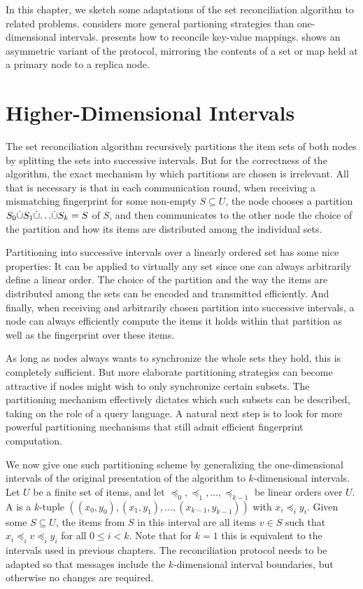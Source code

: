 
In this chapter, we sketch some adaptations of the set reconciliation algorithm to related problems.  considers more general partioning strategies than one-dimensional intervals.  presents how to reconcile key-value mappings.  shows an asymmetric variant of the protocol, mirroring the contents of a set or map held at a primary node to a replica node.

\section{Higher-Dimensional Intervals}
\label{general-partitions}

The set reconciliation algorithm recursively partitions the item sets of both nodes by splitting the sets into successive intervals. But for the correctness of the algorithm, the exact mechanism by which partitions are chosen is irrelevant. All that is necessary is that in each communication round, when receiving a mismatching fingerprint for some non-empty $S \subseteq U$, the node chooses a partition ${S_0} \dot{\cup} {{S_1} \dot{\cup} {{\ldots} \dot{\cup} {S_k}}} = S$ of $S$, and then communicates to the other node the choice of the partition and how its items are distributed among the individual sets.

Partitioning into successive intervals over a linearly ordered set has some nice properties: It can be applied to virtually any set since one can always arbitrarily define a linear order. The choice of the partition and the way the items are distributed among the sets can be encoded and transmitted efficiently. And finally, when receiving and arbitrarily chosen partition into successive intervals, a node can always efficiently compute the items it holds within that partition as well as the fingerprint over these items.

As long as nodes always wants to synchronize the whole sets they hold, this is completely sufficient. But more elaborate partitioning strategies can become attractive if nodes might wish to only synchronize certain subsets. The partitioning mechanism effectively dictates which such subsets can be described, taking on the role of a query language. A natural next step is to look for more powerful partitioning mechanisms that still admit efficient fingerprint computation.

We now give one such partitioning scheme by generalizing the one-dimensional intervals of the original presentation of the algorithm to $k$-dimensional intervals. Let $U$ be a finite set of items, and let $\preceq_0, \preceq_1, \ldots, \preceq_{k-1}$ be linear orders over $U$. A  is a $k$-tuple $((x_0, y_0), (x_1, y_1), \ldots, (x_{k-1}, y_{k-1}))$ with $x_i \preceq_i y_i$. Given some $S \subseteq U$, the items from $S$ in this interval are all items $v \in S$ such that $x_i \preceq_i v \preceq_i y_i$ for all $0 \leq i < k$. Note that for $k = 1$ this is equivalent to the intervals used in previous chapters. The reconciliation protocol needs to be adapted so that messages include the $k$-dimensional interval boundaries, but otherwise no changes are required.

